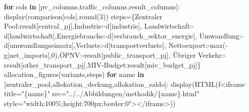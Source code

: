 \documentclass[
  ngerman,
  a4paper,
  DIV=11]{scrreprt}
\newenvironment{Shaded}{\begin{snugshade}}{\end{snugshade}}
\newcommand{\BuiltInTok}[1]{\textcolor[rgb]{0.00,0.23,0.31}{#1}}
\newcommand{\ControlFlowTok}[1]{\textcolor[rgb]{0.00,0.23,0.31}{\textbf{#1}}}
\newcommand{\DecValTok}[1]{\textcolor[rgb]{0.68,0.00,0.00}{#1}}
\newcommand{\KeywordTok}[1]{\textcolor[rgb]{0.00,0.23,0.31}{\textbf{#1}}}
\newcommand{\NormalTok}[1]{\textcolor[rgb]{0.00,0.23,0.31}{#1}}
\newcommand{\OperatorTok}[1]{\textcolor[rgb]{0.37,0.37,0.37}{#1}}
\newcommand{\SpecialCharTok}[1]{\textcolor[rgb]{0.37,0.37,0.37}{#1}}
\newcommand{\SpecialStringTok}[1]{\textcolor[rgb]{0.13,0.47,0.30}{#1}}
\newcommand{\StringTok}[1]{\textcolor[rgb]{0.13,0.47,0.30}{#1}}
\begin{document}
\begin{Shaded}
\begin{Highlighting}[]
\ControlFlowTok{for}\NormalTok{ cols }\KeywordTok{in}\NormalTok{ [pv\_columns,traffic\_columns,result\_columns]: display(comparison[cols].}\BuiltInTok{round}\NormalTok{(}\DecValTok{3}\NormalTok{))}
\NormalTok{steps}\OperatorTok{=}\NormalTok{\{}\StringTok{\textquotesingle{}Zentraler Pool\textquotesingle{}}\NormalTok{:result[}\StringTok{\textquotesingle{}central\_pj\textquotesingle{}}\NormalTok{],}\StringTok{\textquotesingle{}Industrie\textquotesingle{}}\NormalTok{:}\OperatorTok{{-}}\NormalTok{d[}\StringTok{\textquotesingle{}industrie\textquotesingle{}}\NormalTok{],}
       \StringTok{\textquotesingle{}Landwirtschaft\textquotesingle{}}\NormalTok{:}\OperatorTok{{-}}\NormalTok{d[}\StringTok{\textquotesingle{}landwirtschaft\textquotesingle{}}\NormalTok{],}\StringTok{\textquotesingle{}Energiebranche\textquotesingle{}}\NormalTok{:}\OperatorTok{{-}}\NormalTok{d[}\StringTok{\textquotesingle{}verbrauch\_sektor\_energie\textquotesingle{}}\NormalTok{],}
       \StringTok{\textquotesingle{}Umwandlung\textquotesingle{}}\NormalTok{:}\OperatorTok{{-}}\NormalTok{d[}\StringTok{\textquotesingle{}umwandlungseinsatz\textquotesingle{}}\NormalTok{],}\StringTok{\textquotesingle{}Verluste\textquotesingle{}}\NormalTok{:}\OperatorTok{{-}}\NormalTok{d[}\StringTok{\textquotesingle{}transportverluste\textquotesingle{}}\NormalTok{],}
       \StringTok{\textquotesingle{}Nettoexport\textquotesingle{}}\NormalTok{:}\OperatorTok{{-}}\BuiltInTok{max}\NormalTok{(}\OperatorTok{{-}}\NormalTok{g[}\StringTok{\textquotesingle{}net\_imports\textquotesingle{}}\NormalTok{],}\DecValTok{0}\NormalTok{),}\StringTok{\textquotesingle{}ÖPNV\textquotesingle{}}\NormalTok{:}\OperatorTok{{-}}\NormalTok{result[}\StringTok{\textquotesingle{}public\_transport\_pj\textquotesingle{}}\NormalTok{],}
       \StringTok{\textquotesingle{}Übriger Verkehr\textquotesingle{}}\NormalTok{:}\OperatorTok{{-}}\NormalTok{result[}\StringTok{\textquotesingle{}other\_transport\_pj\textquotesingle{}}\NormalTok{],}\StringTok{\textquotesingle{}MIV{-}Budget\textquotesingle{}}\NormalTok{:result[}\StringTok{\textquotesingle{}miv\_budget\_pj\textquotesingle{}}\NormalTok{]\}}
\NormalTok{allocation\_figures(variants,steps)}
\ControlFlowTok{for}\NormalTok{ name }\KeywordTok{in}\NormalTok{ [}\StringTok{\textquotesingle{}zentraler\_pool\textquotesingle{}}\NormalTok{,}\StringTok{\textquotesingle{}allokation\_deckung\textquotesingle{}}\NormalTok{,}\StringTok{\textquotesingle{}allokation\_saldo\textquotesingle{}}\NormalTok{]:}
\NormalTok{    display(HTML(}\SpecialStringTok{f\textquotesingle{}\textless{}iframe title="}\SpecialCharTok{\{}\NormalTok{name}\SpecialCharTok{\}}\SpecialStringTok{" src="../../Abbildungen/methodik/}\SpecialCharTok{\{}\NormalTok{name}\SpecialCharTok{\}}\SpecialStringTok{.html" style="width:100\%;height:700px;border:0"\textgreater{}\textless{}/iframe\textgreater{}\textquotesingle{}}\NormalTok{))}
\end{Highlighting}
\end{Shaded}
\end{document}

